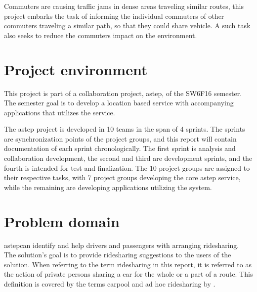 Commuters are causing traffic jams in dense areas traveling similar routes, this project embarks the task of informing the individual commuters of other commuters traveling a similar path, so that they could share vehicle.
A such task also seeks to reduce the commuters impact on the environment.


\section{Project environment}
This project is part of a collaboration project, \gls{astep}, of the SW6F16 semester.
The semester goal is to develop a location based service with accompanying applications that utilizes the service. 

The \gls{astep} project is developed in 10 teams in the span of 4 sprints.
The sprints are synchronization points of the project groups, and this report will contain documentation of each sprint chronologically.
\DIFdelbegin {}\DIFdelend The first sprint is \DIFaddbegin {}\DIFaddend analysis and collaboration development, the second and third are development sprints, and the fourth is intended for test and finalization.
The 10 project groups are assigned to their respective tasks, with 7 project groups developing the core \gls{astep} service, while the remaining \DIFdelbegin {}\DIFdelend \DIFaddbegin {}\DIFaddend are developing applications utilizing the system.



\section{Problem domain}
\DIFdelbegin {}%
\DIFdelend \DIFaddbegin {}\gls{astep}\DIFaddend can identify and help drivers and passengers with arranging ridesharing.
The solution's goal is to provide ridesharing suggestions to the users of the solution.
When referring to the term ridesharing in this report, it is referred to as the action of private persons sharing a car for the whole or a part of a route. 
This definition is covered by the terms carpool and ad hoc ridesharing by \citet{doi:10.1080/01441647.2011.621557}.  

